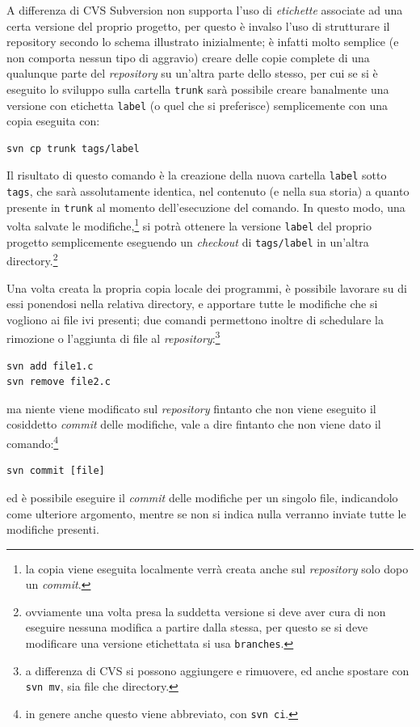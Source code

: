 A differenza di CVS Subversion non supporta l'uso di \textsl{etichette}
associate ad una certa versione del proprio progetto, per questo è invalso
l'uso di strutturare il repository secondo lo schema illustrato inizialmente;
è infatti molto semplice (e non comporta nessun tipo di aggravio) creare delle
copie complete di una qualunque parte del \textit{repository} su un'altra
parte dello stesso, per cui se si è eseguito lo sviluppo sulla cartella
\texttt{trunk} sarà possibile creare banalmente una versione con etichetta
\texttt{label} (o quel che si preferisce) semplicemente con una copia eseguita
con:
\begin{verbatim}
svn cp trunk tags/label
\end{verbatim}

Il risultato di questo comando è la creazione della nuova cartella
\texttt{label} sotto \texttt{tags}, che sarà assolutamente identica, nel
contenuto (e nella sua storia) a quanto presente in \texttt{trunk} al momento
dell'esecuzione del comando. In questo modo, una volta salvate le
modifiche,\footnote{la copia viene eseguita localmente verrà creata anche sul
  \textit{repository} solo dopo un \textit{commit}.} si potrà ottenere la
versione \texttt{label} del proprio progetto semplicemente eseguendo un
\textit{checkout} di \texttt{tags/label} in un'altra
directory.\footnote{ovviamente una volta presa la suddetta versione si deve
  aver cura di non eseguire nessuna modifica a partire dalla stessa, per
  questo se si deve modificare una versione etichettata si usa
  \texttt{branches}.}

Una volta creata la propria copia locale dei programmi, è possibile lavorare
su di essi ponendosi nella relativa directory, e apportare tutte le modifiche
che si vogliono ai file ivi presenti; due comandi permettono inoltre di
schedulare la rimozione o l'aggiunta di file al
\textit{repository}:\footnote{a differenza di CVS si possono aggiungere e
  rimuovere, ed anche spostare con \texttt{svn mv}, sia file che directory.}
\begin{verbatim}
svn add file1.c
svn remove file2.c
\end{verbatim}
ma niente viene modificato sul \textit{repository} fintanto che non viene
eseguito il cosiddetto \textit{commit} delle modifiche, vale a dire fintanto
che non viene dato il comando:\footnote{in genere anche questo viene
  abbreviato, con \texttt{svn ci}.}
\begin{verbatim}
svn commit [file]
\end{verbatim}
ed è possibile eseguire il \textit{commit} delle modifiche per un singolo
file, indicandolo come ulteriore argomento, mentre se non si indica nulla
verranno inviate tutte le modifiche presenti.

